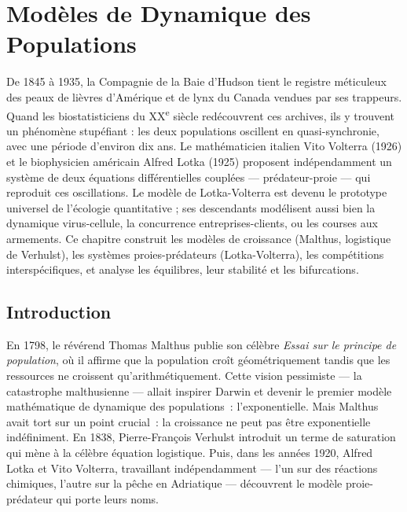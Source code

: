 \chapter{Mod\`eles de Dynamique des Populations}
\label{ch:populations}

De 1845 à 1935, la Compagnie de la Baie d'Hudson tient le registre méticuleux des peaux de lièvres d'Amérique et de lynx du Canada vendues par ses trappeurs. Quand les biostatisticiens du XX\textsuperscript{e} siècle redécouvrent ces archives, ils y trouvent un phénomène stupéfiant : les deux populations oscillent en quasi-synchronie, avec une période d'environ dix ans. Le mathématicien italien Vito Volterra (1926) et le biophysicien américain Alfred Lotka (1925) proposent indépendamment un système de deux équations différentielles couplées --- prédateur-proie --- qui reproduit ces oscillations. Le modèle de Lotka-Volterra est devenu le prototype universel de l'écologie quantitative ; ses descendants modélisent aussi bien la dynamique virus-cellule, la concurrence entreprises-clients, ou les courses aux armements. Ce chapitre construit les modèles de croissance (Malthus, logistique de Verhulst), les systèmes proies-prédateurs (Lotka-Volterra), les compétitions interspécifiques, et analyse les équilibres, leur stabilité et les bifurcations.

\section{Introduction}

En 1798, le r\'ev\'erend Thomas Malthus publie son c\'el\`ebre \emph{Essai sur le principe de population}, o\`u il affirme que la population cro\^it g\'eom\'etriquement tandis que les ressources ne croissent qu'arithm\'etiquement. Cette vision pessimiste --- la \og catastrophe malthusienne \fg --- allait inspirer Darwin et devenir le premier mod\`ele math\'ematique de dynamique des populations~: l'exponentielle. Mais Malthus avait tort sur un point crucial~: la croissance ne peut pas \^etre exponentielle ind\'efiniment. En 1838, Pierre-Fran\c{c}ois Verhulst introduit un terme de saturation qui m\`ene \`a la c\'el\`ebre \'equation logistique. Puis, dans les ann\'ees 1920, Alfred Lotka et Vito Volterra, travaillant ind\'ependamment --- l'un sur des r\'eactions chimiques, l'autre sur la p\^eche en Adriatique --- d\'ecouvrent le mod\`ele proie-pr\'edateur qui porte leurs noms.

